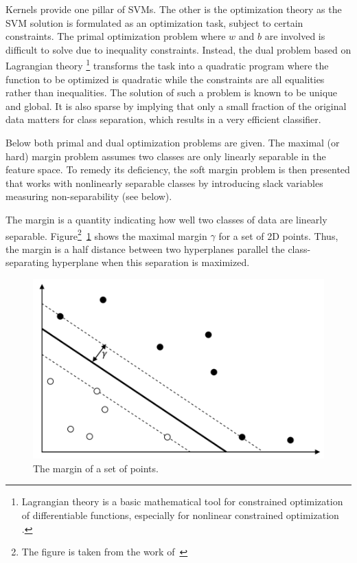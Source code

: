 Kernels provide one pillar of SVMs. The other is the optimization theory as the SVM solution is formulated as an optimization task, subject to certain constraints. The primal optimization problem where \( w \) and \( b \) are involved is difficult to solve due to inequality constraints. Instead, the dual problem based on  Lagrangian theory \footnote{Lagrangian theory is a basic mathematical tool for constrained optimization of differentiable functions, especially for nonlinear constrained optimization \cite{Li:2008}.} transforms the task into a quadratic program where the function to be optimized is quadratic while the constraints are all equalities rather than inequalities. The solution of such a problem is known to be unique and global. It is also sparse by implying that only a small fraction of the original data matters for class separation, which results in a very efficient classifier.

Below both primal and dual optimization problems are given. The maximal (or hard) margin problem assumes two classes are only linearly separable in the feature space. To remedy its deficiency, the soft margin problem is then presented that works with nonlinearly separable classes by introducing slack variables measuring non-separability (see below).

The margin is a quantity indicating how well two classes of data are linearly separable. Figure\footnote{The figure is taken from the work of~\cite{Okun;Valentini:2009}}~\ref{fig:hyperplane3} shows the maximal margin $\gamma$ for a set of 2D points. Thus, the margin is a half distance between two hyperplanes parallel the class-separating hyperplane when this separation is maximized.
\begin{figure}[h!]
    \centering
    \includegraphics[scale=0.6]{Graphics/svm-margins.png}
    \caption{The margin of a set of points.}
    \label{fig:hyperplane3}
\end{figure}

